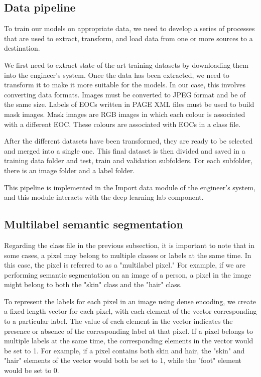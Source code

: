 \documentclass{polytech/polytech}
\numberwithin{figure}{chapter}
\begin{document}
\subsection{Data pipeline}

To train our models on appropriate data, we need to develop a series of processes that are used to extract, transform, and load data from one or more sources to a destination.

We first need to extract state-of-the-art training datasets by downloading them into the engineer's system.
Once the data has been extracted, we need to transform it to make it more suitable for the models.
In our case, this involves converting data formats.
Images must be converted to JPEG format and be of the same size.
Labels of EOCs written in PAGE XML files must be used to build mask images.
Mask images are RGB images in which each colour is associated with a different EOC.
These colours are associated with EOCs in a class file.

After the different datasets have been transformed, they are ready to be selected and merged into a single one.
This final dataset is then divided and saved in a training data folder and test, train and validation subfolders.
For each subfolder, there is an image folder and a label folder.

This pipeline is implemented in the Import data module of the engineer’s system, and this module interacts with the deep learning lab component.


\subsection{Multilabel semantic segmentation}

Regarding the class file in the previous subsection, it is important to note that in some cases, a pixel may belong to multiple classes or labels at the same time.
In this case, the pixel is referred to as a "multilabel pixel."
For example, if we are performing semantic segmentation on an image of a person, a pixel in the image might belong to both the "skin" class and the "hair" class.

To represent the labels for each pixel in an image using dense encoding, we create a fixed-length vector for each pixel, with each element of the vector corresponding to a particular label.
The value of each element in the vector indicates the presence or absence of the corresponding label at that pixel.
If a pixel belongs to multiple labels at the same time, the corresponding elements in the vector would be set to 1.
For example, if a pixel contains both skin and hair, the "skin" and "hair" elements of the vector would both be set to 1, while the "foot" element would be set to 0.
\end{document}
